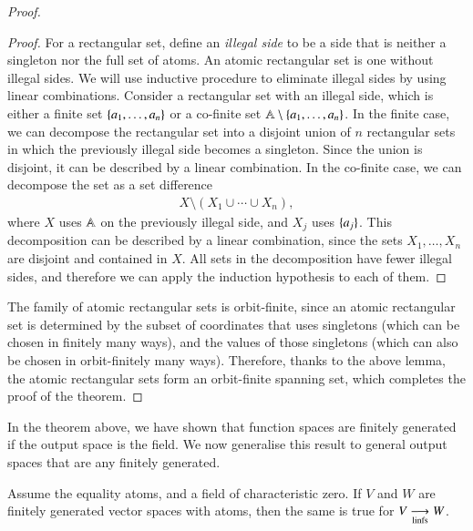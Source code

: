 \begin{proof}
\begin{proof}
        For a rectangular set, define an \emph{illegal side} to be a side that is neither a singleton nor the full set of atoms. An atomic rectangular set is one without illegal sides. We will use inductive procedure to eliminate illegal sides by using linear combinations.  Consider a rectangular set with an illegal side, which is either a finite set  $\{a_1,\ldots,a_n\}$ or a co-finite set $\mathbb A \setminus \{a_1,\ldots,a_n\}$. In the finite case, we can decompose the rectangular set into a disjoint union of $n$  rectangular sets in which the previously illegal side becomes a singleton. Since the union is disjoint, it can be described by a linear combination. In the co-finite case, we can decompose the set  as a set difference 
        \begin{align*}
       X \setminus (X_1 \cup \cdots \cup X_n),
        \end{align*}
        where $X$ uses $\mathbb A$ on the previously illegal side, and $X_j$  uses $\{a_j\}$. This decomposition can be described by a linear combination, since the sets $X_1,\ldots,X_n$ are disjoint and contained in $X$. All sets in the decomposition have fewer illegal sides, and therefore we can apply the induction hypothesis to each of them.
    \end{proof}

    The family of atomic rectangular sets is orbit-finite, since an atomic rectangular set is determined by the subset of coordinates that uses singletons (which can be chosen in finitely many ways), and the values of those singletons (which can also be chosen in orbit-finitely many ways). Therefore, thanks to the above lemma, the atomic rectangular sets form an orbit-finite spanning set, which completes the proof of the theorem. 
\end{proof}

In the theorem above, we have shown that function spaces are finitely generated if the output space is the field. We now generalise this result to general output spaces  that are any finitely generated. 

\begin{theorem}
\label{thm:fsfun-finite-generation-vector-spaces}
    Assume the equality atoms, and a field of characteristic zero. If  $V$ and $W$ are finitely generated vector spaces with atoms, then the same is true for   $
    V \underset{\text{linfs}}{\longrightarrow} W$.
\end{theorem}






